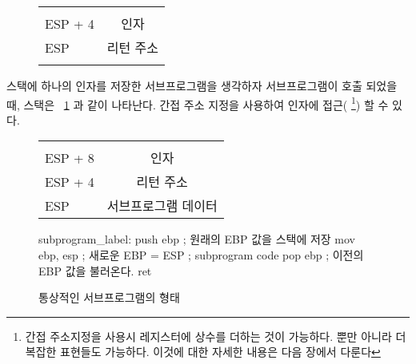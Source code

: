 \begin{figure}
\centering
\begin{tabular}{l|c|}
\cline{2-2}
&  \\ \cline{2-2}
ESP + 4 & 인자 \\ \cline{2-2}
ESP     & 리턴 주소 \\ \cline{2-2}
 & \\ \cline{2-2}
\end{tabular}
\caption{}
\label{fig:stack1}
\end{figure}
스택에 하나의 인자를 저장한 서브프로그램을 생각하자 
서브프로그램이 호출 되었을 때, 스택은 ~\ref{fig:stack1} 과 같이 나타난다.
간접 주소 지정을 사용하여 인자에 접근({\code [ESP+4]} \footnote{간접 주소지정을 사용시 레지스터에 상수를 더하는 것이 가능하다. 
뿐만 아니라 더 복잡한 표현들도 가능하다. 이것에 대한 자세한 내용은 다음 장에서
다룬다}) 할 수 있다. 

\begin{figure}
\centering
\begin{tabular}{l|c|}
\cline{2-2}
&  \\ \cline{2-2}
ESP + 8 & 인자 \\ \cline{2-2}
ESP + 4 & 리턴 주소 \\ \cline{2-2}
ESP     & 서브프로그램 데이터 \\ \cline{2-2}
\end{tabular}
\caption{}
\label{fig:stack2}
\end{figure}

\begin{figure}[t]
\begin{AsmCodeListing}[frame=single]
subprogram_label:
      push   ebp           ; 원래의 EBP 값을 스택에 저장
      mov    ebp, esp      ; 새로운 EBP = ESP
; subprogram code
      pop    ebp           ; 이전의 EBP 값을 불러온다. 
      ret
\end{AsmCodeListing}
\caption{통상적인 서브프로그램의 형태 \label{fig:subskel1}}
\end{figure}


